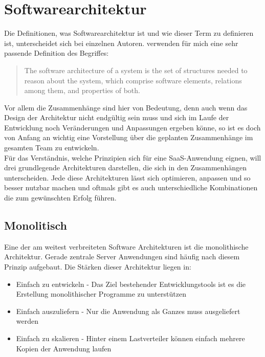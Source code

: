 \section{Softwarearchitektur}
Die Definitionen, was Softwarearchitektur ist und wie dieser Term zu definieren ist, unterscheidet sich bei einzelnen Autoren. \citet*[S. 4]{Bass.2013} verwenden für mich eine sehr passende Definition des Begriffes:
	\begin{quote} 
	The software architecture of a system is the set of structures needed to reason about the system, which comprise software elements, relations among them, and properties of both.
	 \end{quote}
Vor allem die Zusammenhänge sind hier von Bedeutung, denn auch wenn das Design der Architektur nicht endgültig sein muss und sich im Laufe der Entwicklung noch Veränderungen und Anpassungen ergeben könne, so ist es doch von Anfang an wichtig eine Vorstellung über die geplanten Zusammenhänge im gesamten Team zu entwickeln.\\
Für das Verständnis, welche Prinzipien sich für eine SaaS-Anwendung eignen, will drei grundlegende Architekturen darstellen, die sich in den Zusammenhängen unterscheiden. Jede diese Architekturen lässt sich optimieren, anpassen und so besser nutzbar machen und oftmals gibt es auch unterschiedliche Kombinationen die zum gewünschten Erfolg führen.
	\subsection{Monolitisch}
	Eine der am weitest verbreiteten Software Architekturen ist die monolithische Architektur. Gerade zentrale Server Anwendungen sind häufig nach diesem Prinzip aufgebaut. Die Stärken dieser Architektur liegen in:
	\begin{itemize}
	\item Einfach zu entwickeln - Das Ziel bestehender Entwicklungstools ist es die Erstellung monolithischer Programme zu unterstützen 
	\item Einfach auszuliefern - Nur die Anwendung als Ganzes muss ausgeliefert werden
	\item Einfach zu skalieren - Hinter einem Lastverteiler können einfach mehrere Kopien der Anwendung laufen
	\end{itemize}
	
